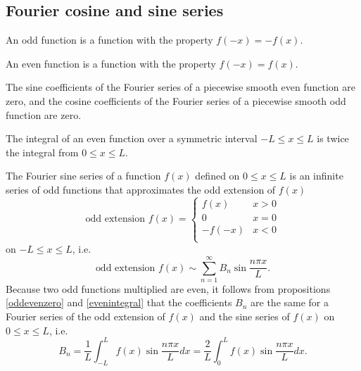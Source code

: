 \documentclass{article}
\begin{document}
\subsection{Fourier cosine and sine series}
\begin{definition}
	An odd function is a function with the property \(f(-x)=-f(x)\).
\end{definition}
\begin{definition}
	An even function is a function with the property \(f(-x)=f(x)\).
\end{definition}
\begin{proposition}
	\label{oddevenzero}
	The sine coefficients of the Fourier series of a piecewise smooth even function are zero, and the cosine coefficients of the Fourier series of a piecewise smooth odd function are zero.
\end{proposition}
\begin{proposition}
	\label{evenintegral}
	The integral of an even function over a symmetric interval \(-L\leq x\leq L\) is twice the integral from \(0\leq x\leq L\).
\end{proposition}
\begin{definition}
	The Fourier sine series of a function \(f(x)\) defined on \(0\leq x\leq L\) is an infinite series of odd functions that approximates the odd extension of \(f(x)\)
	\begin{equation*}
		\text{odd extension }f(x)=\begin{cases}
			f(x)&x>0\\
			0&x=0\\
			-f(-x)&x<0\\
		\end{cases}
	\end{equation*}
		on \(-L\leq x\leq L\), i.e.
	\begin{equation*}
		\text{odd extension }f(x)\sim\sum_{n=1}^{\infty}B_n\sin\frac{n\pi x}{L}.
	\end{equation*}
	Because two odd functions multiplied are even, it follows from propositions \ref{oddevenzero} and \ref{evenintegral} that the coefficients \(B_n\) are the same for a Fourier series of the odd extension of \(f(x)\) and the sine series of \(f(x)\) on \(0\leq x\leq L\), i.e.
	\begin{equation*}
		B_n=\frac{1}{L}\int_{-L}^{L}f(x)\sin\frac{n\pi x}{L}dx=\frac{2}{L}\int_{0}^{L}f(x)\sin\frac{n\pi x}{L}dx.
	\end{equation*}
\end{definition}
\end{document}
